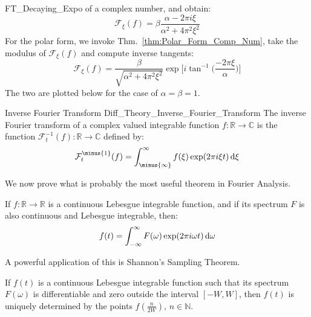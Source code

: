 \begin{lexample}{}{FT_Decaying_Expo}
        of a complex number, and obtain:
        \begin{equation}
            \mathcal{F}_{\xi}(f)
            =\beta\frac{\alpha-2\pi{i}\xi}
                {\alpha^{2}+4\pi^{2}\xi^{2}}
        \end{equation}
        For the polar form, we invoke
        Thm.~\ref{thm:Polar_Form_Comp_Num},
        take the modulus of $\mathcal{F}_{\xi}(f)$
        and compute inverse tangents:
        \begin{equation}
            \mathcal{F}_{\xi}(f)=
            \frac{\beta}{\sqrt{\alpha^{2}+4\pi^{2}\xi^{2}}}
            \exp\Big[i\tan^{\minus{1}}
                \Big(\frac{\minus{2}\pi\xi}{\alpha}\Big)
            \Big]
        \end{equation}
        The two are plotted below for the case of
        $\alpha=\beta=1$.
    \end{lexample}
    \begin{ldefinition}{Inverse Fourier Transform}
          {Diff_Theory_Inverse_Fourier_Transform}
        The inverse Fourier transform of a complex valued
        integrable function
        $f:\mathbb{R}\rightarrow\mathbb{C}$ is the function
        $\mathcal{F}_{t}^{\minus{1}}(f):%
            \mathbb{R}\rightarrow\mathbb{C}$ defined by:
        \begin{equation}
            \mathcal{F}_{t}^{\minus{1}}(f)=
            \int_{\minus{\infty}}^{\infty}
                f(\xi)\exp(2\pi{i}\xi{t})\diff{\xi}
        \end{equation}
    \end{ldefinition}
    We now prove what is probably the most useful theorem
    in Fourier Analysis.
    \begin{theorem}
        If $f:\mathbb{R}\rightarrow\mathbb{R}$ is a
        continuous Lebesgue integrable function,
        and if its spectrum $F$ is also continuous
        and Lebesgue integrable, then:
        \begin{equation}
            f(t)=\int_{-\infty}^{\infty}F(\omega)
            \exp(2\pi{i}\omega{t})\mathop{}\!\mathrm{d}{\omega}
        \end{equation}
    \end{theorem}
    A powerful application of this is
    Shannon's Sampling Theorem.
    \begin{theorem}
        If $f(t)$ is a continuous
        Lebesgue integrable function such that
        its spectrum $F(\omega)$ is differentiable and zero
        outside the interval $[-W,W]$,
        then $f(t)$ is uniquely determined
        by the points $f(\frac{n}{2W})$, $n\in\mathbb{N}$.
    \end{theorem}
